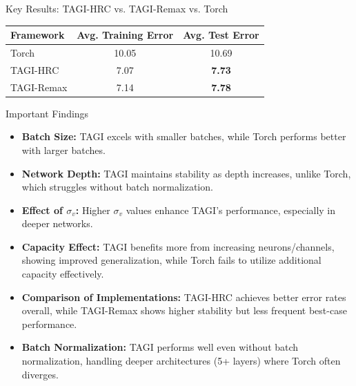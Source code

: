 \documentclass[final]{beamer}
\begin{document}
\begin{frame}[t]
\begin{columns}
\begin{column}[T]{.31\textwidth}

\begin{block}{Key Results: TAGI-HRC vs. TAGI-Remax vs. Torch}
\centering
\begin{tabular}{lcc}
\toprule
Framework & Avg. Training Error & Avg. Test Error \\
\midrule
Torch      & 10.05 & 10.69 \\
TAGI-HRC       & 7.07  & \textbf{7.73} \\
TAGI-Remax & 7.14  & \textbf{7.78} \\
\bottomrule
\end{tabular}
\end{block}

\begin{block}{Important Findings}
\begin{itemize}
    \item \textbf{Batch Size:} TAGI excels with smaller batches, while Torch performs better with larger batches.
    \item \textbf{Network Depth:} TAGI maintains stability as depth increases, unlike Torch, which struggles without batch normalization.
    \item \textbf{Effect of $\sigma_v$:} Higher $\sigma_v$ values enhance TAGI's performance, especially in deeper networks.
    \item \textbf{Capacity Effect:} TAGI benefits more from increasing neurons/channels, showing improved generalization, while Torch fails to utilize additional capacity effectively.
    \item \textbf{Comparison of Implementations:} TAGI-HRC achieves better error rates overall, while TAGI-Remax shows higher stability but less frequent best-case performance.
    \item \textbf{Batch Normalization:} TAGI performs well even without batch normalization, handling deeper architectures (5+ layers) where Torch often diverges.
\end{itemize}
\end{block}


\end{column}
\end{columns}
\end{frame}
\end{document}
